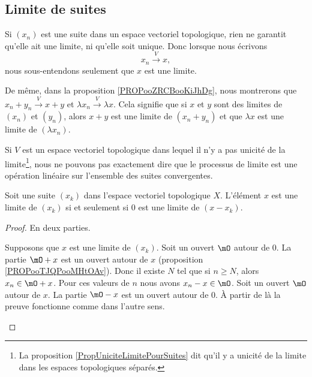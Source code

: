 \subsection{Limite de suites}


\begin{normaltext}
	Si \( (x_n)\) est une suite dans un espace vectoriel topologique, rien ne garantit qu'elle ait une limite, ni qu'elle soit unique. Donc lorsque nous écrivons
	\begin{equation}
		x_n\stackrel{V}{\longrightarrow}x,
	\end{equation}
	nous sous-entendons seulement que \( x\) est une limite.

	De même, dans la proposition \ref{PROPooZRCBooKiJhDg}, nous montrerons que \( x_n+y_n\stackrel{V}{\longrightarrow}x+y\) et \( \lambda x_n\stackrel{ V}{\longrightarrow}\lambda x\). Cela signifie que si \( x\) et \( y\) sont des limites de \( (x_n)\) et \( (y_n)\), alors \( x+y\) est une limite de \( (x_n+y_n)\) et que \( \lambda x\) est une limite de \( (\lambda x_n)\).

	Si \( V\) est un espace vectoriel topologique dans lequel il n'y a pas unicité de la limite\footnote{La proposition \ref{PropUniciteLimitePourSuites} dit qu'il y a unicité de la limite dans les espaces topologiques séparés.}, nous ne pouvons pas exactement dire que le processus de limite est une opération linéaire sur l'ensemble des suites convergentes.
\end{normaltext}



\begin{proposition}	\label{PROPooTJQPooMHtOAv}
	Soit une suite \( (x_k)\) dans l'espace vectoriel topologique \( X\). L'élément \( x\) est une limite de \( (x_k)\) si et seulement si \( 0\) est une limite de \( (x-x_k)\).
\end{proposition}

\begin{proof}
	En deux parties.
	\begin{subproof}
		\spitem[\( \Rightarrow\)]
		Supposons que \( x\) est une limite de \( (x_k)\). Soit un ouvert \( \mO\) autour de \( 0\). La partie \( \mO+x\) est un ouvert autour de \( x\) (proposition \ref{PROPooTJQPooMHtOAv}). Donc il existe \( N\) tel que si \( n\geq N\), alors \( x_n\in\mO+x\). Pour ces valeurs de \( n\) nous avons \( x_n-x\in\mO\).
		\spitem[\( \Leftarrow\)]
		Soit un ouvert \( \mO\) autour de \( x\). La partie \( \mO-x\) est un ouvert autour de \( 0\). À partir de là la preuve fonctionne comme dans l'autre sens.
	\end{subproof}
\end{proof}

